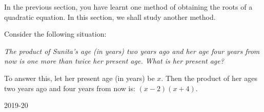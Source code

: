 \documentclass[a4paper,12pt]{article}
\begin{document}
In the previous section, you have learnt one method of obtaining the roots of a quadratic equation. In this section, we shall study another method.

Consider the following situation:

\textit{The product of Sunita’s age (in years) two years ago and her age four years from now is one more than twice her present age. What is her present age?}

To answer this, let her present age (in years) be $x$. Then the product of her ages two years ago and four years from now is:
$(x - 2)(x + 4).$
\vspace{1.2cm}
\begin{center}
2019-20
\end{center}
\end{document}
